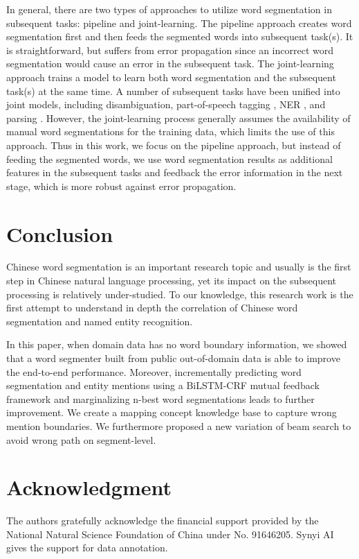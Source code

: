 \documentclass[conference]{IEEEtran}
\begin{document}
In general, there are two types of approaches to utilize word segmentation in subsequent tasks: pipeline and joint-learning. The pipeline approach creates word segmentation first and then feeds the segmented words into subsequent task(s). It is straightforward, but suffers from error propagation since an incorrect word segmentation would cause an error in the subsequent task. The joint-learning approach trains a model to learn both word segmentation and the subsequent task(s) at the same time. A number of subsequent tasks have been unified into joint models,
including disambiguation\cite{b22}, part-of-speech tagging \cite{nn},
NER \cite{nn}, and parsing \cite{nn}. However, the joint-learning process generally assumes the availability of manual word segmentations for the training data, which limits the use of this approach. Thus in this work, we focus on the pipeline approach, but instead of feeding the segmented words, we use word segmentation results as additional features in the subsequent tasks and feedback the error information in the next stage, which is more robust against error propagation.

\section{Conclusion}
Chinese word segmentation is an important research topic and usually is the first step in Chinese natural language processing, yet its impact on the subsequent processing is relatively under-studied. To our knowledge, this research work is the first attempt to understand in depth the correlation of Chinese word segmentation and named entity recognition.

In this paper, when domain data has no word boundary information, we showed that a word segmenter built from public out-of-domain data is able to improve the end-to-end performance. Moreover, incrementally predicting word segmentation and entity mentions using a BiLSTM-CRF mutual feedback framework and marginalizing n-best word segmentations leads to further improvement. We create a mapping concept knowledge base to capture wrong mention boundaries. We furthermore proposed a new variation of beam search to avoid wrong path on segment-level. 

\section*{Acknowledgment}

The authors gratefully acknowledge the financial support
provided by the National Natural Science Foundation of China
under No. 91646205. Synyi AI gives the support for data annotation.
\end{document}
